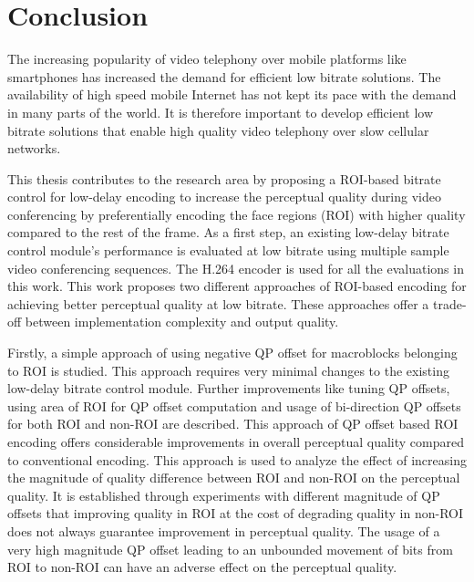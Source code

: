 \chapter{Conclusion} \label{chapter:conclusion}
\thispagestyle{empty}%

The increasing popularity of video telephony over mobile platforms like smartphones has increased the demand for efficient low bitrate solutions. The availability of high speed mobile Internet has not kept its pace with the demand in many parts of the world. It is therefore important to develop efficient low bitrate solutions that enable high quality video telephony over slow cellular networks. 

This thesis contributes to the research area by proposing a ROI-based bitrate control for low-delay encoding to increase the perceptual quality during video conferencing by preferentially encoding the face regions (ROI) with higher quality compared to the rest of the frame. As a first step, an existing low-delay bitrate control module's performance is evaluated at low bitrate using multiple sample video conferencing sequences. The H.264 encoder is used for all the evaluations in this work. This work proposes two different approaches of ROI-based encoding for achieving better perceptual quality at low bitrate. These approaches offer a trade-off between implementation complexity and output quality. 

Firstly, a simple approach of using negative QP offset for macroblocks belonging to ROI is studied. This approach requires very minimal changes to the existing low-delay bitrate control module. Further improvements like tuning QP offsets, using area of ROI for QP offset computation and usage of bi-direction QP offsets for both ROI and non-ROI are described. This approach of QP offset based ROI encoding offers considerable improvements in overall perceptual quality compared to conventional encoding. This approach is used to analyze the effect of increasing the magnitude of quality difference between ROI and non-ROI on the perceptual quality. It is established through experiments with different magnitude of QP offsets that improving quality in ROI at the cost of degrading quality in non-ROI does not always guarantee improvement in perceptual quality. The usage of a very high magnitude QP offset leading to an unbounded movement of bits from ROI to non-ROI can have an adverse effect on the perceptual quality.

